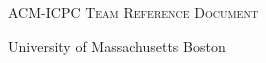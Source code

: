 \documentclass[letterpaper]{article} %
\begin{document}
  \thispagestyle{fancy}
  
  \begin{center}
    \Huge\textsc{ACM-ICPC Team Reference Document}

    \huge University of Massachusetts Boston

    \vspace{0.50cm}
  \end{center}
  
  \begin{multicols*}{2}
    \tableofcontents
  \end{multicols*}
  
  \enlargethispage*{\baselineskip}
  \pagebreak
  
  
  \setcounter{page}{1}
  
  \begin{multicols*}{2}
    
  \end{multicols*}
\end{document}
